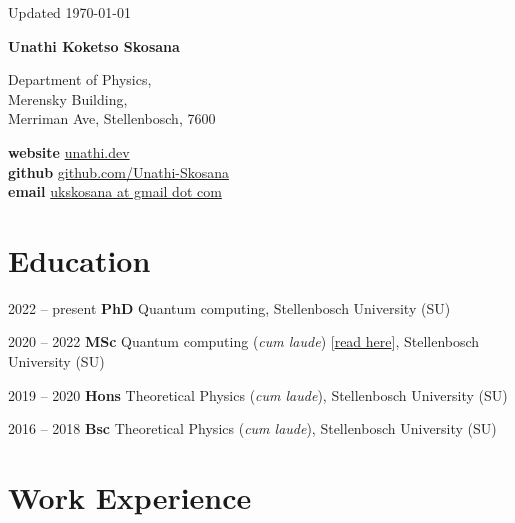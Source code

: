 \documentclass[letterpaper, 11pt]{report}
\newcommand{\namefont}[1]{{\normalfont\bfseries\Huge{#1}}}
\newcommand*{\name}{
    Unathi Koketso Skosana
}
\begin{document}
    \begin{center}
        \vfill
        \small {Updated \monthyeardate\today}
    \end{center}

    \vspace{2em}

    \namefont{\name}

    \vspace{1em}

    \begin{minipage}[t]{0.45\linewidth}
      Department of Physics, \\
      Merensky Building, \\
      Merriman Ave, Stellenbosch, 7600
    \end{minipage}
    \hfill
    \begin{minipage}[t]{0.5\linewidth}
        \textbf{website} \href{https://www.unathi.dev}{unathi.dev} \\
        \textbf{github}  \href{https://www.github.com/Unathi-Skosana}{github.com/Unathi-Skosana}  \\
        \textbf{email} \href{mailto:ukskosana@gmail.com}{ukskosana at gmail dot com} \hfill
    \end{minipage}


    \section*{Education}

    \begin{tablist}
      \item[2022 -- present]     \tab{}\textbf{PhD} Quantum computing, Stellenbosch University (SU)
      \item[2020 -- 2022] \tab{}\textbf{MSc} Quantum computing (\textit{cum laude}) [\href{https://github.com/Unathi-Skosana/mastersthesis}{read here}], Stellenbosch University (SU)
      \item[2019 -- 2020]  \tab{}\textbf{Hons} Theoretical Physics (\textit{cum laude}), Stellenbosch University (SU)
      \item[2016 -- 2018]  \tab{}\textbf{Bsc} Theoretical Physics (\textit{cum laude}), Stellenbosch University (SU)
    \end{tablist}


    \section*{Work Experience}
\end{document}
